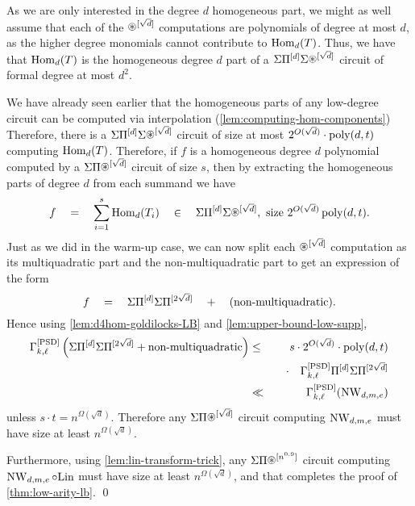 As we are only interested in the degree $d$ homogeneous part, we might as well assume that each of the $\circast^{[\sqrt{d}]}$ computations are polynomials of degree at most $d$, as the higher degree monomials cannot contribute to $\operatorname{Hom}_d(T)$. Thus, we have that $\operatorname{Hom}_d(T)$ is the homogeneous degree $d$ part of a  $\Sigma\Pi^{[d]}\Sigma\circast^{[\sqrt{d}]}$ circuit of formal degree at most $d^2$. 

We have already seen earlier that the homogeneous parts of any low-degree circuit can be computed via interpolation (\autoref{lem:computing-hom-components})
Therefore, there is a $\Sigma\Pi^{[d]}\Sigma\circast^{[\sqrt{d}]}$ circuit of size at most $2^{O(\sqrt{d})} \cdot \operatorname{poly}(d,t)$ computing $\operatorname{Hom}_d(T)$. Therefore, if $f$ is a homogeneous degree $d$ polynomial computed by a $\SPA^{[\sqrt{d}]}$ circuit of size $s$, then by extracting the homogeneous parts of degree $d$ from each summand we have 
\[
f \spaced{=} \sum_{i=1}^s \Hom_d(T_i) \spaced{\in} \Sigma\Pi^{[d]}\Sigma\circast^{[\sqrt{d}]},\text{ size $2^{O(\sqrt{d})} \poly(d,t)$}.
\]
Just as we did in the warm-up case, we can now split each $\circast^{[\sqrt{d}]}$ computation as its multiquadratic part and the non-multiquadratic part to get an expression of the form
\[
f \quad = \quad \Sigma\Pi^{[d]}\Sigma\Pi^{[2\sqrt{d}]}  \quad + \quad (\text{non-multiquadratic}).
\]
Hence using \autoref{lem:d4hom-goldilocks-LB} and \autoref{lem:upper-bound-low-supp}, 
\begin{eqnarray*}
\Gamma^{\mathrm{[PSD]}}_{k,\ell}\left(\Sigma\Pi^{[d]}\Sigma\Pi^{[2\sqrt{d}]} + \text{non-multiquadratic}\right) &\leq & s\cdot 2^{O(\sqrt{d})} \cdot \operatorname{poly}(d,t)\\
& & \quad \cdot \quad \Gamma^{\mathrm{[PSD]}}_{k,\ell}{\Pi^{[d]}\Sigma\Pi^{[2\sqrt{d}]}}\\
& \ll & \Gamma^{\mathrm{[PSD]}}_{k,\ell}(\operatorname{\mathrm{NW}}_{d,m,e})
\end{eqnarray*}
unless $s \cdot t = n^{\Omega(\sqrt{d})}$. Therefore any $\SPA^{[\sqrt{d}]}$ circuit computing $\operatorname{\mathrm{NW}}_{d,m,e}$ must have size at least $n^{\Omega(\sqrt{d})}$.

Furthermore, using \autoref{lem:lin-transform-trick}, any $\SPA^{[n^{0.9}]}$ circuit computing $\operatorname{\mathrm{NW}}_{d,m,e} \circ \mathrm{Lin}$ must have size at least $n^{\Omega(\sqrt{d})}$, and that completes the proof of \autoref{thm:low-arity-lb}. \qed




